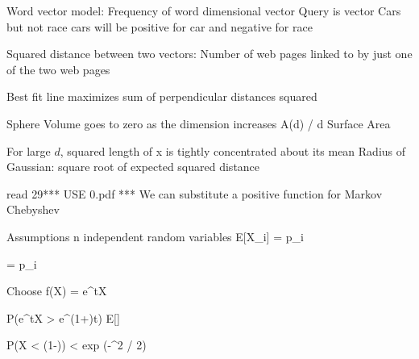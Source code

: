 Word vector model: Frequency of word dimensional vector
Query is vector
	Cars but not race cars will be positive for car and negative for race

Squared distance between two vectors: Number of web pages linked to by just one of the two web pages

Best fit line maximizes sum of perpendicular distances squared

Sphere
	Volume goes to zero as the dimension increases
		A(d) / d
	Surface Area


For large $d$, squared length of x is tightly concentrated about its mean
Radius of Gaussian: square root of expected squared distance


read 29*** USE 0.pdf ***
	We can substitute a positive function for Markov
	Chebyshev	




Assumptions
	n independent random variables
	E[X_i] = p_i

\mu = \sum p_i

Choose f(X) = e^{tX}

P(e^{tX} > e^{(1+\del)t\mu}) \le E[]





P(X < (1-\gamma)\mu ) < exp (-\mu\gamma^2 / 2)








